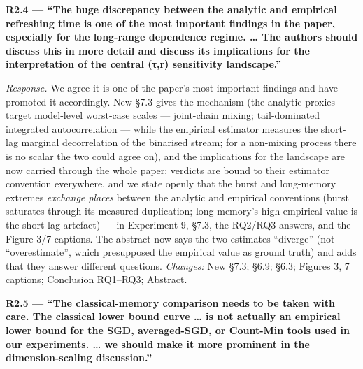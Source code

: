 \documentclass[
  11pt,
]{article}
\begin{document}
\textbf{R2.4 --- ``The huge discrepancy between the analytic and
empirical refreshing time is one of the most important findings in the
paper, especially for the long-range dependence regime. \ldots{} The
authors should discuss this in more detail and discuss its implications
for the interpretation of the central (τ,r) sensitivity landscape.''}

\emph{Response.} We agree it is one of the paper's most important
findings and have promoted it accordingly. New §7.3 gives the mechanism
(the analytic proxies target model-level worst-case scales ---
joint-chain mixing; tail-dominated integrated autocorrelation --- while
the empirical estimator measures the short-lag marginal decorrelation of
the binarised stream; for a non-mixing process there is no scalar the
two could agree on), and the implications for the landscape are now
carried through the whole paper: verdicts are bound to their estimator
convention everywhere, and we state openly that the burst and
long-memory extremes \emph{exchange places} between the analytic and
empirical conventions (burst saturates through its measured duplication;
long-memory's high empirical value is the short-lag artefact) --- in
Experiment 9, §7.3, the RQ2/RQ3 answers, and the Figure 3/7 captions.
The abstract now says the two estimates ``diverge'' (not
``overestimate'', which presupposed the empirical value as ground truth)
and adds that they answer different questions. \emph{Changes:} New §7.3;
§6.9; §6.3; Figures 3, 7 captions; Conclusion RQ1--RQ3; Abstract.

\textbf{R2.5 --- ``The classical-memory comparison needs to be taken
with care. The classical lower bound curve \ldots{} is not actually an
empirical lower bound for the SGD, averaged-SGD, or Count-Min tools used
in our experiments. \ldots{} we should make it more prominent in the
dimension-scaling discussion.''}
\end{document}
